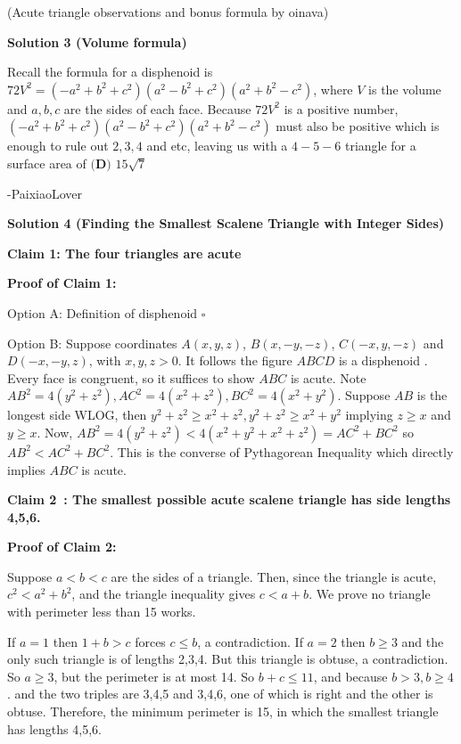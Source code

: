 \begin{enumerate}
 


 (Acute triangle observations and bonus formula by oinava)

 



\textbf{Solution 3 (Volume formula)}

Recall the formula for a disphenoid is $72V^2=(-a^2+b^2+c^2)(a^2-b^2+c^2)(a^2+b^2-c^2)$, where $V$ is the volume and $a,b,c$ are the sides of each face. Because $72V^2$ is a positive number, $(-a^2+b^2+c^2)(a^2-b^2+c^2)(a^2+b^2-c^2)$ must also be positive which is enough to rule out $2,3,4$ and etc, leaving us with a $4-5-6$ triangle for a surface area of $\boxed{\textbf{(D) }15\sqrt{7}}$

 -PaixiaoLover

 



\textbf{Solution 4 (Finding the Smallest Scalene Triangle with Integer Sides)}

\textbf{Claim 1: The four triangles are acute}

 \textbf{Proof of Claim 1:}

 Option A: Definition of disphenoid $\square$

 Option B: Suppose coordinates $A(x,y,z)$, $B(x,-y,-z)$, $C(-x,y,-z)$ and $D(-x,-y,z)$, with $x,y,z > 0$. It follows the figure $ABCD$ is a disphenoid . Every face is congruent, so it suffices to show $ABC$ is acute. Note $AB^2=4(y^2+z^2),AC^2=4(x^2+z^2),BC^2=4(x^2+y^2)$. Suppose $AB$ is the longest side WLOG, then $y^2+z^2\ge x^2+z^2, y^2+z^2\ge x^2+y^2$ implying $z \ge x$ and $y \ge x$. Now, $AB^2=4(y^2+z^2)<4(x^2+y^2+x^2+z^2)=AC^2+BC^2$ so $AB^2 < AC^2 + BC^2$. This is the converse of Pythagorean Inequality which directly implies $ABC$ is acute.

 \textbf{Claim 2 : The smallest possible acute scalene triangle has side lengths 4,5,6.}

 \textbf{Proof of Claim 2:}

 Suppose $a<b<c$ are the sides of a triangle. Then, since the triangle is acute, $c^2 < a^2 + b^2$, and the triangle inequality gives $c < a+b$. We prove no triangle with perimeter less than 15 works.

 If $a = 1$ then $1+b > c$ forces $c \le b$, a contradiction. If $a = 2$ then $b \ge 3$ and the only such triangle is of lengths 2,3,4. But this triangle is obtuse, a contradiction. So $a \ge 3$, but the perimeter is at most 14. So $b+c \le 11$, and because $b > 3, b\ge 4$. and the two triples are 3,4,5 and 3,4,6, one of which is right and the other is obtuse. Therefore, the minimum perimeter is 15, in which the smallest triangle has lengths 4,5,6.


\end{enumerate}
